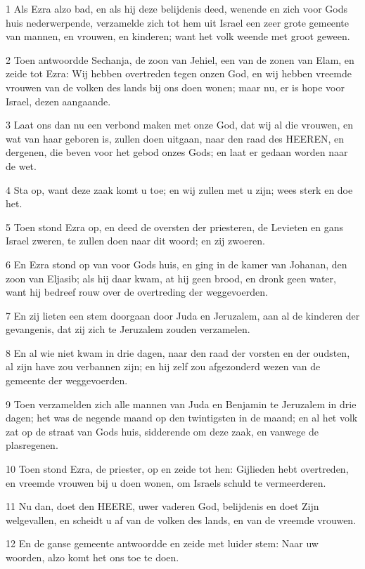 \par 1 Als Ezra alzo bad, en als hij deze belijdenis deed, wenende en zich voor Gods huis nederwerpende, verzamelde zich tot hem uit Israel een zeer grote gemeente van mannen, en vrouwen, en kinderen; want het volk weende met groot geween.
\par 2 Toen antwoordde Sechanja, de zoon van Jehiel, een van de zonen van Elam, en zeide tot Ezra: Wij hebben overtreden tegen onzen God, en wij hebben vreemde vrouwen van de volken des lands bij ons doen wonen; maar nu, er is hope voor Israel, dezen aangaande.
\par 3 Laat ons dan nu een verbond maken met onze God, dat wij al die vrouwen, en wat van haar geboren is, zullen doen uitgaan, naar den raad des HEEREN, en dergenen, die beven voor het gebod onzes Gods; en laat er gedaan worden naar de wet.
\par 4 Sta op, want deze zaak komt u toe; en wij zullen met u zijn; wees sterk en doe het.
\par 5 Toen stond Ezra op, en deed de oversten der priesteren, de Levieten en gans Israel zweren, te zullen doen naar dit woord; en zij zwoeren.
\par 6 En Ezra stond op van voor Gods huis, en ging in de kamer van Johanan, den zoon van Eljasib; als hij daar kwam, at hij geen brood, en dronk geen water, want hij bedreef rouw over de overtreding der weggevoerden.
\par 7 En zij lieten een stem doorgaan door Juda en Jeruzalem, aan al de kinderen der gevangenis, dat zij zich te Jeruzalem zouden verzamelen.
\par 8 En al wie niet kwam in drie dagen, naar den raad der vorsten en der oudsten, al zijn have zou verbannen zijn; en hij zelf zou afgezonderd wezen van de gemeente der weggevoerden.
\par 9 Toen verzamelden zich alle mannen van Juda en Benjamin te Jeruzalem in drie dagen; het was de negende maand op den twintigsten in de maand; en al het volk zat op de straat van Gods huis, sidderende om deze zaak, en vanwege de plasregenen.
\par 10 Toen stond Ezra, de priester, op en zeide tot hen: Gijlieden hebt overtreden, en vreemde vrouwen bij u doen wonen, om Israels schuld te vermeerderen.
\par 11 Nu dan, doet den HEERE, uwer vaderen God, belijdenis en doet Zijn welgevallen, en scheidt u af van de volken des lands, en van de vreemde vrouwen.
\par 12 En de ganse gemeente antwoordde en zeide met luider stem: Naar uw woorden, alzo komt het ons toe te doen.
